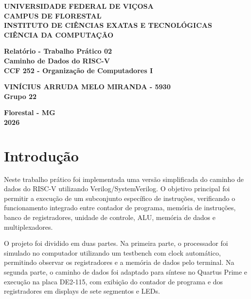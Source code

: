 \documentclass[12pt,a4paper]{article}
\begin{document}
\begin{titlepage}
    \begin{center}
        \textbf{UNIVERSIDADE FEDERAL DE VIÇOSA}\\
        \textbf{CAMPUS DE FLORESTAL}\\
        \textbf{INSTITUTO DE CIÊNCIAS EXATAS E TECNOLÓGICAS}\\
        \textbf{CIÊNCIA DA COMPUTAÇÃO}\\
        \vspace{4cm}

        \textbf{Relatório - Trabalho Prático 02}\\
        \textbf{Caminho de Dados do RISC-V}\\
        \vspace{0.5cm}
        \textbf{CCF 252 - Organização de Computadores I}\\
        \vspace{4cm}

        \textbf{VINÍCIUS ARRUDA MELO MIRANDA - 5930}\\
        \textbf{Grupo 22}\\
        \vfill

        \textbf{Florestal - MG}\\
        \textbf{2026}
    \end{center}
\end{titlepage}

\tableofcontents
\newpage

\section{Introdução}

Neste trabalho prático foi implementada uma versão simplificada do caminho de dados do RISC-V utilizando Verilog/SystemVerilog. O objetivo principal foi permitir a execução de um subconjunto específico de instruções, verificando o funcionamento integrado entre contador de programa, memória de instruções, banco de registradores, unidade de controle, ALU, memória de dados e multiplexadores.

O projeto foi dividido em duas partes. Na primeira parte, o processador foi simulado no computador utilizando um testbench com clock automático, permitindo observar os registradores e a memória de dados pelo terminal. Na segunda parte, o caminho de dados foi adaptado para síntese no Quartus Prime e execução na placa DE2-115, com exibição do contador de programa e dos registradores em displays de sete segmentos e LEDs.
\end{document}

